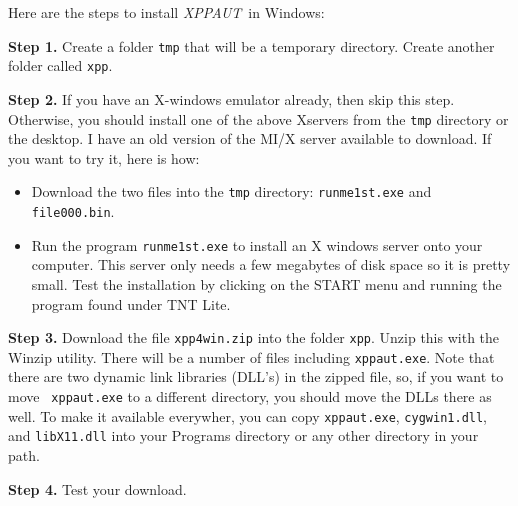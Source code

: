 \documentclass{article}
\newcommand{\XPP}{{\sl XPPAUT\, }}
\begin{document}
Here are the steps to install \XPP in Windows:
\begin{description}
\item{\bf Step 1.} Create a folder {\tt tmp} that will be a temporary
directory. Create another folder called {\tt xpp}.  
\item{\bf Step 2.}  If you have an X-windows emulator already, then
skip this step. Otherwise, you should install one of the above Xservers 
from the {\tt tmp} directory or the desktop. 
I have an old version of the MI/X server available to download. If
you want to try it, here is how:
\begin{itemize}
\item Download the 
two files into the {\tt tmp} directory: {\tt runme1st.exe} and {\tt
file000.bin}.  
\item Run the program {\tt runme1st.exe} to install an X
windows server onto your computer. This server only needs a few
megabytes of disk space so it is pretty small.  Test the installation
by clicking on the START menu and running the program found under TNT
Lite.  
\end{itemize}

\item{\bf Step 3.} Download the file {\tt xpp4win.zip} into the
folder {\tt xpp}.  Unzip this with the Winzip utility.  There will be
a number of files including {\tt xppaut.exe}. 
Note that there are two
dynamic link libraries (DLL's) in the zipped file, so, if you want to move {\tt
xppaut.exe} to a different directory, you should
move the DLLs there as well.  To make it available everywher, you can
copy {\tt xppaut.exe}, {\tt cygwin1.dll}, and {\tt libX11.dll} into
your Programs directory or any other directory in your path. 
\item{\bf Step 4.}  Test your download.

\begin{description}


\end{description}
\end{description}
\end{document}
